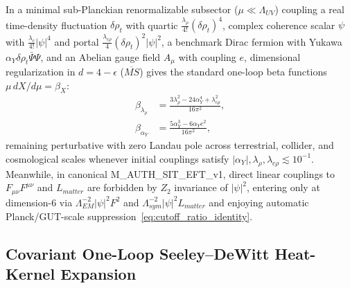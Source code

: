 \documentclass[american,11pt,letterpaper]{article}
\def\mathbb#1{#1}%
\def\mathcal#1{#1}%
\def\mathrm#1{#1}%
\def\texttt#1{#1}%
\begin{document}
In a minimal sub-Planckian renormalizable subsector ($\mu \ll \Lambda_{\mathrm{UV}}$) coupling a real time-density fluctuation $\delta\rho_t$ with quartic $\frac{\lambda_\rho}{4!}(\delta\rho_t)^4$, complex coherence scalar $\psi$ with $\frac{\lambda_c}{4!}|\psi|^4$ and portal $\frac{\lambda_{c\rho}}{4}(\delta\rho_t)^2|\psi|^2$, a benchmark Dirac fermion with Yukawa $\alpha_Y\delta\rho_t\bar{\Psi}\Psi$, and an Abelian gauge field $A_\mu$ with coupling $e$, dimensional regularization in $d = 4 - \epsilon$ ($\overline{\mathrm{MS}}$) gives the standard one-loop beta functions $\mu\,dX/d\mu = \beta_X$:
\begin{align}
\beta_{\lambda_\rho} &= \frac{3\lambda_\rho^2 - 24\alpha_Y^4 + \lambda_{c\rho}^2}{16\pi^2}, \label{eq:beta_lambda_rho_sec22}\\
\beta_{\alpha_Y} &= \frac{5\alpha_Y^3 - 6\alpha_Y e^2}{16\pi^2}, \label{eq:beta_alpha_sec22}
\end{align}
remaining perturbative with zero Landau pole across terrestrial, collider, and cosmological scales whenever initial couplings satisfy $|\alpha_Y|, \lambda_\rho, \lambda_{c\rho} \lesssim 10^{-1}$. Meanwhile, in canonical \texttt{M\_AUTH\_SIT\_EFT\_v1}, direct linear couplings to $F_{\mu\nu}F^{\mu\nu}$ and $\mathcal{L}_{\mathrm{matter}}$ are forbidden by $\mathbb{Z}_2$ invariance of $|\psi|^2$, entering only at dimension-6 via $\Lambda_{\mathrm{EM}}^{-2}|\psi|^2 F^2$ and $\Lambda_{\mathrm{sym}}^{-2}|\psi|^2\mathcal{L}_{\mathrm{matter}}$ and enjoying automatic Planck/GUT-scale suppression~\eqref{eq:cutoff_ratio_identity}.

\subsection{Covariant One-Loop Seeley--DeWitt Heat-Kernel Expansion}
\end{document}
